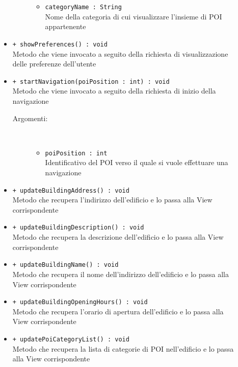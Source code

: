 \documentclass[../DefinizioneDiProdotto.tex]{subfiles}
\begin{document}
\begin{description}
\begin{itemize}
\begin{description}
\begin{itemize}
				\item \texttt{categoryName : String}\\
				Nome della categoria di cui visualizzare l'insieme di POI appartenente\end{itemize}
		\end{description}
		\item \texttt{+ showPreferences() : void}\\
		Metodo che viene invocato a seguito della richiesta di visualizzazione delle preferenze dell'utente
		\item \texttt{+ startNavigation(poiPosition : int) : void}\\
		Metodo che viene invocato a seguito della richiesta di inizio della navigazione
		\begin{description}
			\item[Argomenti:] \
			\begin{itemize}
				\item \texttt{poiPosition : int}\\
				Identificativo del POI verso il quale si vuole effettuare una navigazione\end{itemize}
		\end{description}
		\item \texttt{+ updateBuildingAddress() : void}\\
		Metodo che recupera l'indirizzo dell'edificio e lo passa alla View corrispondente
		\item \texttt{+ updateBuildingDescription() : void}\\
		Metodo che recupera la descrizione dell'edificio e lo passa alla View corrispondente
		\item \texttt{+ updateBuildingName() : void}\\
		Metodo che recupera il nome dell'indirizzo dell'edificio e lo passa alla View corrispondente
		\item \texttt{+ updateBuildingOpeningHours() : void}\\
		Metodo che recupera l'orario di apertura dell'edificio e lo passa alla View corrispondente
		\item \texttt{+ updatePoiCategoryList() : void}\\
		Metodo che recupera la lista di categorie di POI nell'edificio e lo passa alla View corrispondente
	\end{itemize}
\end{description}
\end{document}
